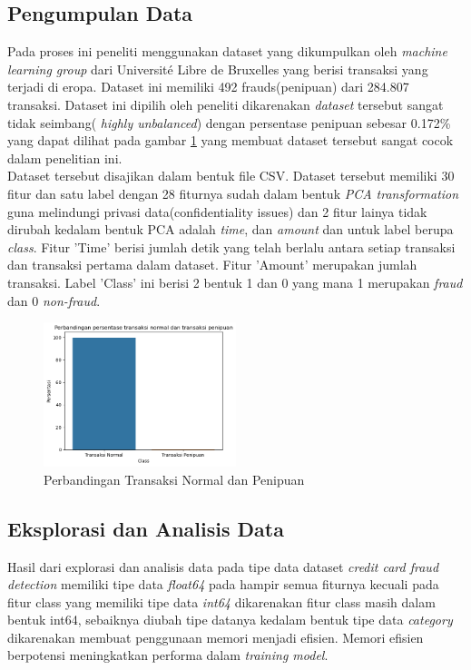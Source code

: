 \subsection{Pengumpulan Data} \label{III.pengumpulandata}
Pada proses ini peneliti menggunakan dataset yang dikumpulkan oleh \textit{machine learning group} dari Université Libre de Bruxelles\cite{WinNT,leborgne2022fraud} yang berisi transaksi yang terjadi di eropa. Dataset ini memiliki 492 frauds(penipuan) dari 284.807 transaksi. Dataset ini dipilih oleh peneliti dikarenakan \textit{dataset} tersebut sangat tidak seimbang(\textit{ highly unbalanced}) dengan persentase penipuan sebesar 0.172\% yang dapat dilihat pada gambar \ref{fig:3.Perbandingan Transaksi Normal dan Penipuan} yang membuat dataset tersebut sangat cocok dalam penelitian ini.\\
Dataset tersebut disajikan dalam bentuk file CSV. Dataset tersebut memiliki 30 fitur dan satu label dengan 28 fiturnya sudah dalam bentuk \textit{PCA transformation} guna melindungi privasi data(confidentiality issues) dan 2 fitur lainya tidak dirubah kedalam bentuk PCA adalah \textit{time}, dan \textit{amount} dan untuk label berupa \textit{class}. Fitur 'Time' berisi jumlah detik yang telah berlalu antara setiap transaksi dan transaksi pertama dalam dataset. Fitur 'Amount' merupakan jumlah transaksi. Label 'Class' ini berisi 2 bentuk 1 dan 0 yang mana 1 merupakan \textit{fraud} dan 0 \textit{non-fraud}.
\begin{figure}[H]
	\centering
	\includegraphics[width=0.5\textwidth]{figure/perbandinganpersentasenormalpenipuan.png}
	\caption{Perbandingan Transaksi Normal dan Penipuan}
	\label{fig:3.Perbandingan Transaksi Normal dan Penipuan}
\end{figure}

\subsection{Eksplorasi dan Analisis Data}
Hasil dari explorasi dan analisis data pada tipe data  dataset \textit{credit card fraud detection} memiliki tipe data \textit{float64} pada hampir semua fiturnya kecuali pada fitur class yang memiliki tipe data \textit{int64} dikarenakan fitur class masih dalam bentuk int64, sebaiknya diubah tipe datanya kedalam bentuk tipe data \textit{category} dikarenakan membuat penggunaan memori menjadi efisien\cite{mckinney2024pandas}. Memori efisien  berpotensi meningkatkan performa dalam \textit{training model}. 

